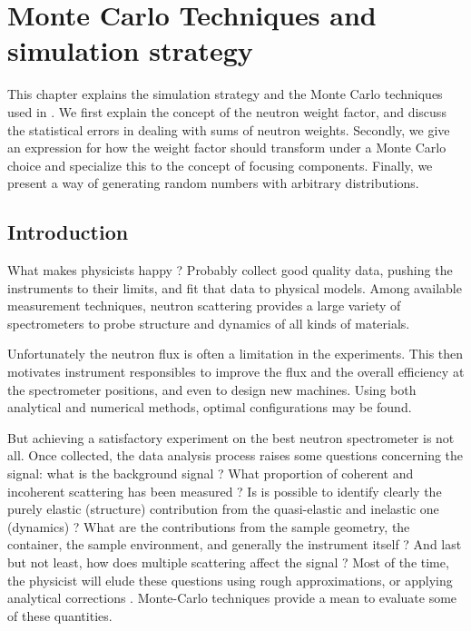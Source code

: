 
\chapter{Monte Carlo Techniques and simulation strategy}
\label{s:MCtechniques}

This chapter explains the simulation strategy and the Monte Carlo
techniques used in \MCS. We first explain the concept of the neutron
weight factor, and discuss the statistical errors in dealing with sums
of neutron weights.  Secondly, we give an expression for how the weight
factor should transform under a Monte Carlo choice and specialize this
to the concept of focusing components.  Finally, we present a way of
generating random numbers with arbitrary distributions.

\section{Introduction}
What makes physicists happy ? Probably collect good quality data, pushing the instruments to their limits, and fit that data to physical models.
Among available measurement techniques, neutron scattering provides a large variety of spectrometers to probe structure and dynamics of all kinds of materials.

Unfortunately the neutron flux is often a limitation in the experiments. This then motivates instrument responsibles to improve the flux and the overall efficiency at the spectrometer positions, and even to design new machines. Using both analytical and numerical methods, optimal configurations may be found.

But achieving a satisfactory experiment on the best neutron spectrometer is not all. Once collected, the data analysis process raises some questions concerning the signal: what is the background signal ? What proportion of coherent and incoherent scattering has been measured ? Is is possible to identify clearly the purely elastic (structure) contribution from the quasi-elastic and inelastic one (dynamics) ? What are the contributions from the sample geometry, the container, the sample environment, and generally the instrument itself ? And last but not least, how does multiple scattering affect the signal ? Most of the time, the physicist will elude these questions using rough approximations, or applying analytical corrections \cite{Copley86}. Monte-Carlo techniques provide a mean to evaluate some of these quantities.

